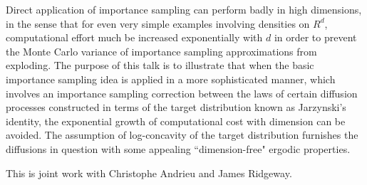 Direct application of importance sampling can perform badly in high
dimensions, in the sense that for even very simple examples involving
densities on $R^d$, computational effort much be increased
exponentially with $d$ in order to prevent the Monte Carlo variance
of importance sampling approximations from exploding.
The purpose of this talk is to illustrate that when the basic
importance sampling idea is applied in a more sophisticated manner,
which involves an importance sampling correction between the laws
of certain diffusion processes constructed in terms of the target
distribution known as Jarzynski's identity, the exponential growth of
computational cost with dimension can be avoided. The assumption
of log-concavity of the target distribution furnishes the diffusions in
question with some appealing ``dimension-free" ergodic properties.

This is joint work with Christophe Andrieu and James Ridgeway.